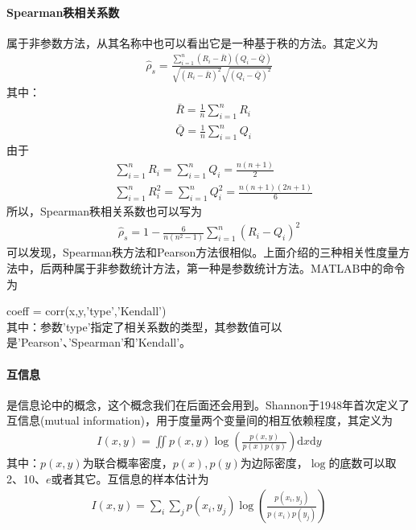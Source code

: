         \paragraph{Spearman秩相关系数}属于非参数方法，从其名称中也可以看出它是一种基于秩的方法。其定义为
        \begin{align*}
        \hat{\rho}_s = \frac{\sum\limits_{i=1}^n(R_i - \bar{R})(Q_i - \bar{Q})}{\sqrt{(R_i - \bar{R})^2}\sqrt{(Q_i - \bar{Q})^2}}
        \end{align*}
        其中：
        \begin{align*}
        &\bar{R} = \frac{1}{n}\sum_{i=1}^nR_i\\
        &\bar{Q} = \frac{1}{n}\sum_{i=1}^nQ_i
        \end{align*}
        由于
        \begin{align*}
        &\sum_{i=1}^n R_i = \sum_{i=1}^n Q_i = \frac{n(n+1)}{2}\\
        &\sum_{i=1}^n R_i^2 = \sum_{i=1}^n Q_i^2 = \frac{n(n+1)(2n+1)}{6}
        \end{align*}
        所以，Spearman秩相关系数也可以写为
        \begin{align*}
        \hat{\rho}_s = 1-\frac{6}{n(n^2-1)}\sum_{i=1}^n(R_i-Q_i)^2
        \end{align*}
        可以发现，Spearman秩方法和Pearson方法很相似。上面介绍的三种相关性度量方法中，后两种属于非参数统计方法，第一种是参数统计方法。MATLAB中的命令为
        \par
        coeff = corr(x,y,'type','Kendall')\\
        其中：参数'type'指定了相关系数的类型，其参数值可以是'Pearson'、'Spearman'和'Kendall'。
        \paragraph{互信息}是信息论中的概念，这个概念我们在后面还会用到。Shannon于1948年首次定义了互信息(mutual information)，用于度量两个变量间的相互依赖程度，其定义为
        \begin{align*}
        I(x,y) = \iint p(x,y) \log \left( \frac{p(x,y)}{p(x)p(y)} \right)  \mathrm{d}x\mathrm{d}y
        \end{align*}
        其中：$p(x,y)$为联合概率密度，$p(x),p(y)$为边际密度，$\log$的底数可以取2、10、$e$或者其它。互信息的样本估计为
        \begin{align*}
        I(x,y) = \sum_i \sum_j p(x_i,y_j) \log \left( \frac{p(x_i,y_j)}{p(x_i)p(y_j)} \right)
        \end{align*}

